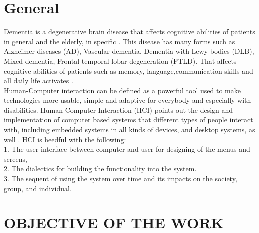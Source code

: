 \section{General}    %

Dementia is a degenerative brain disease that affects cognitive abilities of patients in general and the elderly, in specific . This disease has many forms such as Alzheimer diseases (AD), Vascular dementia, Dementia with Lewy bodies (DLB), Mixed dementia, Frontal temporal lobar degeneration (FTLD). That affects cognitive abilities of patients such as memory, language,communication skills and all daily life activates .\\
Human-Computer interaction can be defined as a powerful tool used to make technologies more usable, simple and adaptive for everybody and especially with disabilities. Human-Computer Interaction (HCI) points out the design and implementation of computer based systems that different types of people interact with, including embedded systems in all kinds of devices, and desktop systems, as well . HCI is heedful with the following:\\
1. The user interface between computer and user for designing of the menus and screens,\\
2. The dialectics for building the functionality into the system.\\
3. The sequent of using the system over time and its impacts on the society, group, and individual.\\
 




 \section{OBJECTIVE OF THE WORK}     %

